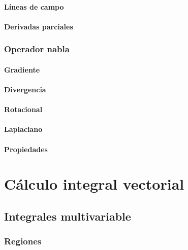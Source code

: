 \documentclass[12pt, fleqn]{report}                             %
\theoremstyle{break}                                            %
\begin{document}
            \subsection{Líneas de campo}
            
            \subsection{Derivadas parciales}
        
        \section{Operador nabla}
        
            \subsection{Gradiente}
            
            \subsection{Divergencia}
            
            \subsection{Rotacional}
            
            \subsection{Laplaciano}
            
            \subsection{Propiedades}



\part{Cálculo integral vectorial}

    \chapter{Integrales multivariable}
    
        \section{Regiones}
        
\end{document}
